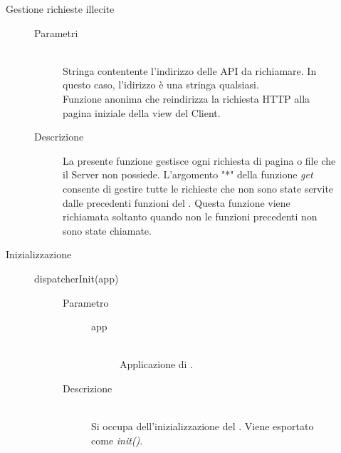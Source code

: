 \begin{description}
\begin{description}
\begin{mldescription}
 \end{mldescription}

\item[Gestione richieste illecite]
 \begin{mldescription}
 \begin{description}
  \item[Parametri]
   \begin{mldescription}
     \hfill \\
    Stringa contentente l'indirizzo delle API da richiamare. In questo caso, l'idirizzo è una stringa qualsiasi.
     \hfill \\
    Funzione anonima che reindirizza la richiesta HTTP alla pagina iniziale della view del Client.
   \end{mldescription}
  \item[Descrizione]
 La presente funzione gestisce ogni richiesta di pagina o file che il Server non possiede. L'argomento "*" della funzione \textit{get} consente di gestire tutte le richieste che non sono state servite dalle precedenti funzioni del . Questa funzione viene richiamata soltanto quando non le funzioni precedenti non sono state chiamate.
 \end{description} 
 \end{mldescription}

\item[Inizializzazione] \hfill
 \begin{description}
  \item[dispatcherInit(app)] \hfill 
  \begin{description}
   \item[Parametro] \hfill 
    \begin{description}
     \item[app] \hfill \\
     Applicazione di .
    \end{description}
   \item[Descrizione] \hfill \\
   Si occupa dell'inizializzazione del . Viene esportato come \textit{init()}.
  \end{description}
 \end{description}
\end{description}
\end{description}



